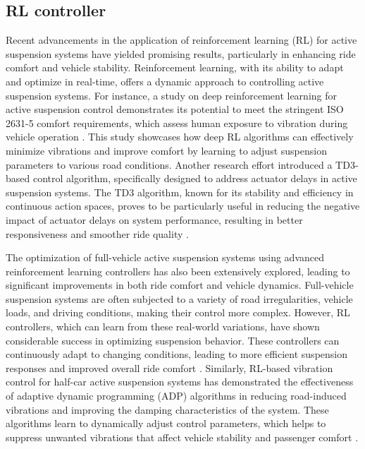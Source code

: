 \subsection{RL controller}
Recent advancements in the application of reinforcement learning (RL) for active suspension systems have yielded promising results, particularly in enhancing ride comfort and vehicle stability. Reinforcement learning, with its ability to adapt and optimize in real-time, offers a dynamic approach to controlling active suspension systems. For instance, a study on deep reinforcement learning for active suspension control demonstrates its potential to meet the stringent ISO 2631-5 comfort requirements, which assess human exposure to vibration during vehicle operation \cite{deep_rl_suspension}. This study showcases how deep RL algorithms can effectively minimize vibrations and improve comfort by learning to adjust suspension parameters to various road conditions. Another research effort introduced a TD3-based control algorithm, specifically designed to address actuator delays in active suspension systems. The TD3 algorithm, known for its stability and efficiency in continuous action spaces, proves to be particularly useful in reducing the negative impact of actuator delays on system performance, resulting in better responsiveness and smoother ride quality \cite{td3_active_suspension}.

The optimization of full-vehicle active suspension systems using advanced reinforcement learning controllers has also been extensively explored, leading to significant improvements in both ride comfort and vehicle dynamics. Full-vehicle suspension systems are often subjected to a variety of road irregularities, vehicle loads, and driving conditions, making their control more complex. However, RL controllers, which can learn from these real-world variations, have shown considerable success in optimizing suspension behavior. These controllers can continuously adapt to changing conditions, leading to more efficient suspension responses and improved overall ride comfort \cite{ai_rl_full_vehicle}. Similarly, RL-based vibration control for half-car active suspension systems has demonstrated the effectiveness of adaptive dynamic programming (ADP) algorithms in reducing road-induced vibrations and improving the damping characteristics of the system. These algorithms learn to dynamically adjust control parameters, which helps to suppress unwanted vibrations that affect vehicle stability and passenger comfort \cite{rl_half_car}.

